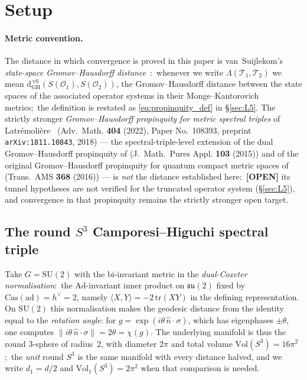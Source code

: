 \documentclass[11pt,a4paper]{article}
\theoremstyle{plain}
\theoremstyle{definition}
\newcommand{\sthree}{S^{3}}
\newcommand{\Op}{\mathcal{O}}
\newcommand{\Tcal}{\mathcal{T}}
\newcommand{\SU}{\mathrm{SU}}
\newcommand{\Vol}{\mathrm{Vol}}
\begin{document}
\section{Setup}\label{sec:setup}

\paragraph{Metric convention.}
The distance in which convergence is proved in this paper is
van~Suijlekom's \emph{state-space Gromov--Hausdorff
distance}~\cite{vs2021_jgp}:\ whenever we write
$\Lambda(\Tcal_1, \Tcal_2)$ we mean
$\mathrm{d}_{\mathrm{GH}}^{\,\mathrm{vS}}(S(\Op_1), S(\Op_2))$, the
Gromov--Hausdorff distance between the state spaces of the associated
operator systems in their Monge--Kantorovich metrics;\ the definition
is restated as \eqref{eq:propinquity_def} in \S\ref{sec:L5}. The
strictly stronger \emph{Gromov--Hausdorff propinquity for metric
spectral triples} of
Latr\'emoli\`ere~\cite{latremoliere_metric_st_2017}
(Adv.~Math. \textbf{404} (2022), Paper No.~108393, preprint
\texttt{arXiv:1811.10843}, 2018) --- the spectral-triple-level
extension of the dual Gromov--Hausdorff propinquity of
\cite{latremoliere2015} (J.~Math.~Pures Appl. \textbf{103} (2015))
and of the original Gromov--Hausdorff propinquity for quantum compact
metric spaces of \cite{latremoliere2016} (Trans.~AMS \textbf{368}
(2016)) --- is \emph{not} the distance established here:\
\textbf{[OPEN]} its tunnel
hypotheses are not verified for the truncated operator system
(\S\ref{sec:L5}), and convergence in that propinquity remains the
strictly stronger open target.

\subsection{The round $\sthree$ Camporesi--Higuchi spectral triple}
\label{sec:ch_triple}

Take $G = \SU(2)$ with the bi-invariant metric in the
\emph{dual-Coxeter normalisation}:\ the $\mathrm{Ad}$-invariant inner
product on $\mathfrak{su}(2)$ fixed by $\mathrm{Cas}(\mathrm{ad}) =
h^\vee = 2$, namely $\langle X, Y\rangle = -2\,\mathrm{tr}(XY)$ in the
defining representation.  On $\SU(2)$ this normalisation makes the
geodesic distance from the identity equal to the \emph{rotation angle}:
for $g = \exp(i\theta\,\hat n \cdot \sigma)$, which has eigenphases
$\pm\theta$, one computes $\lVert i\theta\,\hat n \cdot \sigma\rVert =
2\theta = \chi(g)$.  The underlying manifold is thus the round 3-sphere
of radius~$2$, with diameter $2\pi$ and total volume
$\Vol(\sthree) = 16\pi^2$;\ the \emph{unit} round $\sthree$ is the same
manifold with every distance halved, and we write $d_1 = d/2$ and
$\Vol_1(\sthree) = 2\pi^2$ when that comparison is needed.
\end{document}
